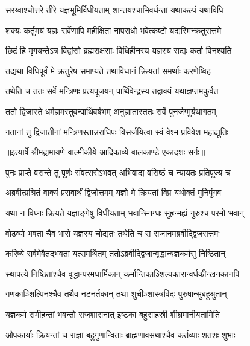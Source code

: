 \twolineshloka
{सरय्वाश्चोत्तरे तीरे यज्ञभूमिर्विधीयताम्}
{शान्तयश्चाभिवर्धन्तां यथाकल्पं यथाविधि} %

\twolineshloka
{शक्यः कर्तुमयं यज्ञः सर्वेणापि महीक्षिता}
{नापराधो भवेत्कष्टो यद्यस्मिन्क्रतुसत्तमे} %

\twolineshloka
{छिद्रं हि मृगयन्तेऽत्र विद्वांसो ब्रह्मराक्षसाः}
{विधिहीनस्य यज्ञस्य सद्यः कर्ता विनश्यति} %

\twolineshloka
{तद्यथा विधिपूर्वं मे क्रतुरेष समाप्यते}
{तथाविधानं क्रियतां समर्थाः करणेष्विह} %

\twolineshloka
{तथेति च ततः सर्वे मन्त्रिणः प्रत्यपूजयन्}
{पार्थिवेन्द्रस्य तद्वाक्यं यथाज्ञप्तमकुर्वत} %

\twolineshloka
{ततो द्विजास्ते धर्मज्ञमस्तुवन्पार्थिवर्षभम्}
{अनुज्ञातास्ततः सर्वे पुनर्जग्मुर्यथागतम्} %

\twolineshloka
{गतानां तु द्विजातीनां मन्त्रिणस्तान्नराधिपः}
{विसर्जयित्वा स्वं वेश्म प्रविवेश महाद्युतिः} %


{॥इत्यार्षे श्रीमद्रामायणे वाल्मीकीये आदिकाव्ये बालकाण्डे एकादशः सर्गः॥}


\twolineshloka
{पुनः प्राप्ते वसन्ते तु पूर्णः संवत्सरोऽभवत्}
{अभिवाद्य वसिष्ठं च न्यायतः प्रतिपूज्य च} %

\twolineshloka
{अब्रवीत्प्रश्रितं वाक्यं प्रसवार्थं द्विजोत्तमम्}
{यज्ञो मे क्रियतां विप्र यथोक्तं मुनिपुंगव} %

\twolineshloka
{यथा न विघ्नः क्रियते यज्ञाङ्गेषु विधीयताम्}
{भवान्स्निग्धः सुहृन्मह्यं गुरुश्च परमो भवान्} %

\twolineshloka
{वोढव्यो भवता चैव भारो यज्ञस्य चोद्यतः}
{तथेति च स राजानमब्रवीद्द्विजसत्तमः} %

\twolineshloka
{करिष्ये सर्वमेवैतद्भवता यत्समर्थितम्}
{ततोऽब्रवीद्द्विजान्वृद्धान्यज्ञकर्मसु निष्ठितान्} %

\twolineshloka
{स्थापत्ये निष्ठितांश्चैव वृद्धान्परमधार्मिकान्}
{कर्मान्तिकाञ्शिल्पकारान्वर्धकीन्खनकानपि} %

\twolineshloka
{गणकाञ्शिल्पिनश्चैव तथैव नटनर्तकान्}
{तथा शुचीञ्शास्त्रविदः पुरुषान्सुबहुश्रुतान्} %

\twolineshloka
{यज्ञकर्म समीहन्तां भवन्तो राजशासनात्}
{इष्टका बहुसाहस्री शीघ्रमानीयतामिति} %

\twolineshloka
{औपकार्याः क्रियन्तां च राज्ञां बहुगुणान्विताः}
{ब्राह्मणावसथाश्चैव कर्तव्याः शतशः शुभाः} %

